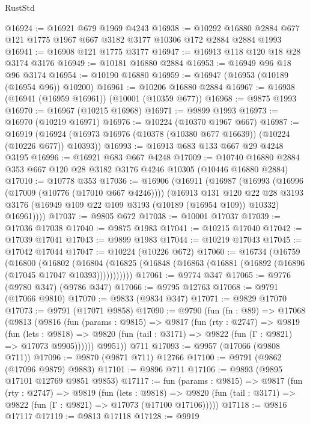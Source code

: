 \begin{lexlean}{RustStd}
\begin{coremodule}
@16924 := @16921 @679 @1969 @4243
@16938 := @10292 @16880 @2884 @677 @121 @1775 @1967 @667 @3182 @3177 @10306 @172 @2884 @2884 @1993
@16941 := @16908 @121 @1775 @3177
@16947 := @16913 @118 @120 @18 @28 @3174 @3176
@16949 := @10181 @16880 @2884
@16953 := @16949 @96 @18 @96 @3174
@16954 := @10190 @16880
@16959 := @16947 (@16953 (@10189 (@16954 @96)) @10200)
@16961 := @10206 @16880 @2884
@16967 := @16938 (@16941 (@16959 @16961)) (@10001 (@10359 @677))
@16968 := @9875 @1993
@16970 := @16967 (@10215 @16968)
@16971 := @9899 @1993
@16973 := @16970 (@10219 @16971)
@16976 := @10224 (@10370 @1967 @667)
@16987 := @16919
    (@16924 (@16973 @16976 (@10378 (@10380 @677 @16639)) (@10224 (@10226 @677)) @10393))
@16993 := @16913 @683 @133 @667 @29 @4248 @3195
@16996 := @16921 @683 @667 @4248
@17009 := @10740 @16880 @2884 @353 @667 @120 @28 @3182 @3176 @4246 @10305 (@10446 @16880 @2884)
@17010 := @10778 @353
@17036 := @16906
    (@16911
      (@16987
        (@16993
          (@16996 (@17009 (@10776 (@17010 @667 @4246))))
          (@16913
            @131
            @120
            @22
            @28
            @3193
            @3176
            (@16949 @109 @22 @109 @3193 (@10189 (@16954 @109)) @10332)
            @16961))))
@17037 := @9805 @672
@17038 := @10001 @17037
@17039 := @17036 @17038
@17040 := @9875 @1983
@17041 := @10215 @17040
@17042 := @17039 @17041
@17043 := @9899 @1983
@17044 := @10219 @17043
@17045 := @17042 @17044
@17047 := @10224 (@10226 @672)
@17060 := @16734
    (@16759
      (@16800
        (@16802
          (@16804 (@16825 (@16848 (@16863 (@16881 (@16892 (@16896 (@17045 @17047 @10393)))))))))))
@17061 := @9774 @347
@17065 := @9776 (@9780 @347) (@9786 @347)
@17066 := @9795 @12763
@17068 := @9791 (@17066 @9810)
@17070 := @9833 (@9834 @347)
@17071 := @9829 @17070
@17073 := @9791 (@17071 @9858)
@17090 := @9790
    (fun (fn : @89) =>
    @17068
      (@9813
        (@9816
          (fun (params : @9815) =>
          @9817
            (fun (rty : @2747) =>
            @9819
              (fun (lets : @9818) =>
              @9820 (fun (tail : @3171) => @9822 (fun (Γ : @9821) => @17073 @9905))))))
        @9951))
    @711
@17093 := @9957 (@17066 (@9808 @711))
@17096 := @9870 (@9871 @711) @12766
@17100 := @9791 (@9862 (@17096 @9879) @9883)
@17101 := @9896 @711
@17106 := @9893 (@9895 @17101 @12769 @9851 @9853)
@17117 := fun (params : @9815) =>
  @9817
    (fun (rty : @2747) =>
    @9819
      (fun (lets : @9818) =>
      @9820 (fun (tail : @3171) => @9822 (fun (Γ : @9821) => @17073 (@17100 @17106)))))
@17118 := @9816 @17117
@17119 := @9813 @17118
@17128 := @9919

\end{coremodule}
\end{lexlean}
